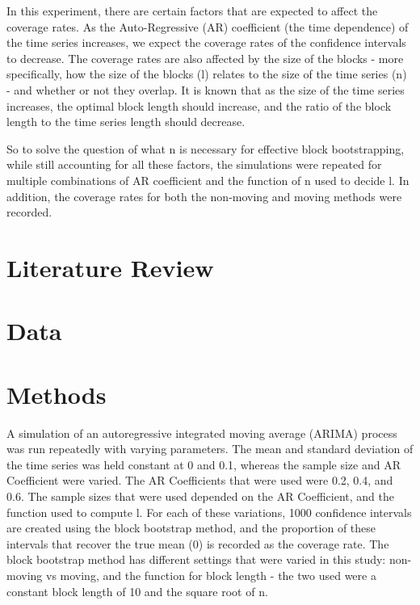 \documentclass[12pt, letterpaper, titlepage]{article}
\begin{document}
In this experiment, there are certain factors that are expected to affect the coverage
rates. As the Auto-Regressive (AR) coefficient (the time dependence) of the time series increases,
we expect the coverage rates of the confidence intervals to decrease.
The coverage rates are also affected by the size of the blocks - more specifically,
how the size of the blocks (l) relates to the size of the time series (n) - 
and whether or not they overlap. It is known that as the size of the time series increases, the optimal block length should increase, and the ratio of the block length to the time series length should decrease.

So to solve the question of what n is necessary for effective block bootstrapping,
while still accounting for all these factors, the simulations were repeated for
multiple combinations of AR coefficient and the function of n used to decide l. In addition, the coverage rates
for both the non-moving and moving methods were recorded.

\section{Literature Review}
\label{sec:litreview}




\section{Data}
\label{sec:data}




\section{Methods}
\label{sec:methods}

A simulation of an autoregressive integrated moving average (ARIMA) process was run repeatedly with varying parameters. 
The mean and standard deviation of the time series was held constant at 0 and 0.1, whereas the sample size and AR Coefficient
 were varied. The AR Coefficients that were used were 0.2, 0.4, and 0.6. The sample sizes that were used depended on the AR
 Coefficient, and the function used to compute l. For each of these variations, 1000 confidence intervals are created using
 the block bootstrap method, and the proportion of these intervals that recover the true mean (0) is recorded as the coverage
 rate. The block bootstrap method has different settings that were varied in this study: non-moving vs moving, 
and the function for block length - the two used were a constant block length of 10 and the square root of n.
\end{document}
